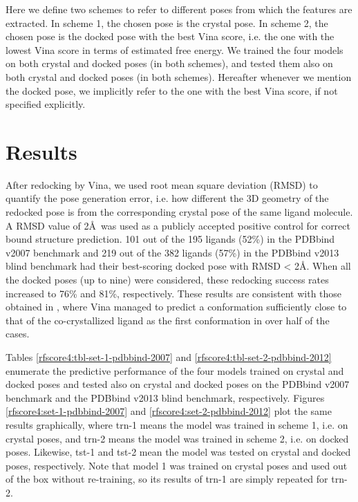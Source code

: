 Here we define two schemes to refer to different poses from which the features are extracted. In scheme 1, the chosen pose is the crystal pose. In scheme 2, the chosen pose is the docked pose with the best Vina score, i.e. the one with the lowest Vina score in terms of estimated free energy. We trained the four models on both crystal and docked poses (in both schemes), and tested them also on both crystal and docked poses (in both schemes). Hereafter whenever we mention the docked pose, we implicitly refer to the one with the best Vina score, if not specified explicitly.

\section{Results}

After redocking by Vina, we used root mean square deviation (RMSD) to quantify the pose generation error, i.e. how different the 3D geometry of the redocked pose is from the corresponding crystal pose of the same ligand molecule. A RMSD value of 2\AA\ was used as a publicly accepted positive control for correct bound structure prediction. 101 out of the 195 ligands (52\%) in the PDBbind v2007 benchmark and 219 out of the 382 ligands (57\%) in the PDBbind v2013 blind benchmark had their best-scoring docked pose with RMSD < 2\AA. When all the docked poses (up to nine) were considered, these redocking success rates increased to 76\% and 81\%, respectively. These results are consistent with those obtained in \citep{1362}, where Vina managed to predict a conformation sufficiently close to that of the co-crystallized ligand as the first conformation in over half of the cases.

Tables \ref{rfscore4:tbl-set-1-pdbbind-2007} and \ref{rfscore4:tbl-set-2-pdbbind-2012} enumerate the predictive performance of the four models trained on crystal and docked poses and tested also on crystal and docked poses on the PDBbind v2007 benchmark and the PDBbind v2013 blind benchmark, respectively. Figures \ref{rfscore4:set-1-pdbbind-2007} and \ref{rfscore4:set-2-pdbbind-2012} plot the same results graphically, where trn-1 means the model was trained in scheme 1, i.e. on crystal poses, and trn-2 means the model was trained in scheme 2, i.e. on docked poses. Likewise, tst-1 and tst-2 mean the model was tested on crystal and docked poses, respectively. Note that model 1 was trained on crystal poses and used out of the box without re-training, so its results of trn-1 are simply repeated for trn-2.

